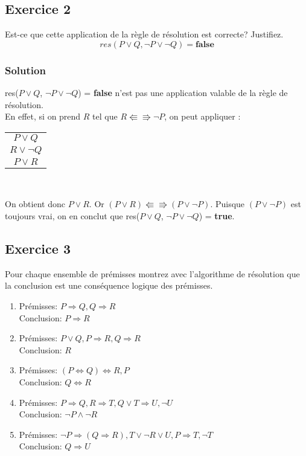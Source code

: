 \subsection*{Exercice 2}
Est-ce que cette application de la règle de résolution est correcte? Justifiez.
$$
res(P \vee Q, \neg P \vee \neg Q) = \textbf{false}
$$

    \subsubsection*{Solution}
    
res($P \lor Q$, $\neg P \lor \neg Q$) = \textbf{false} n'est pas une application valable de la règle de résolution.\\
En effet, si on prend $R$ tel que $R \Lleftarrow\!\!\!\!\Rrightarrow \neg P$, on peut appliquer :
\begin{center}
\begin{tabular}{c}
$P \lor Q$ \\
$R \lor \neg Q$\\
\hline
$P \lor R$\\
\end{tabular}\\
\end{center}
On obtient donc $P \lor R$.
Or $(P \lor R) \Lleftarrow\!\!\!\!\Rrightarrow (P \lor \neg P)$.
Puisque $(P \lor \neg P)$ est toujours vrai, on en conclut que res($P \lor Q$, $\neg P \lor \neg Q$) = \textbf{true}.

\subsection*{Exercice 3}
Pour chaque ensemble de prémisses montrez avec l'algorithme de résolution que la conclusion est une conséquence logique des prémisses.
\begin{enumerate}
 \item 
 Prémisses: $P \Rightarrow Q, Q \Rightarrow R$ \\
 Conclusion: $P \Rightarrow R$
 \item
 Prémisses: $P \vee Q, P \Rightarrow R, Q \Rightarrow R$ \\
 Conclusion: $R$
 \item
 Prémisses: $(P \Leftrightarrow Q) \Leftrightarrow R, P$ \\
 Conclusion: $Q \Leftrightarrow R$
 \item
 Prémisses: $P \Rightarrow Q, R \Rightarrow T, Q \vee T \Rightarrow U, \neg U$ \\
 Conclusion: $\neg P \wedge \neg R$
 \item
 Prémisses: $\neg P \Rightarrow (Q \Rightarrow R), T \vee \neg R \vee U, P \Rightarrow T, \neg T$ \\
 Conclusion: $Q \Rightarrow U$
\end{enumerate}

